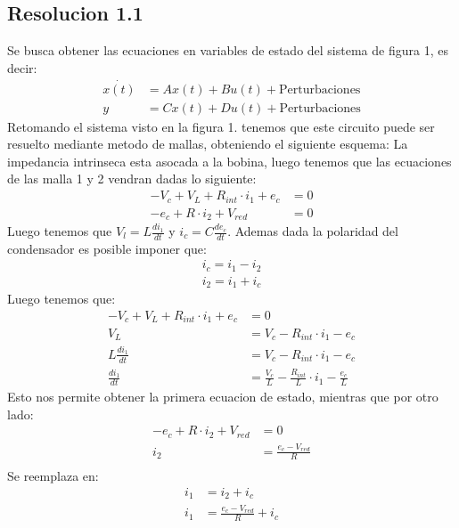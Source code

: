 \documentclass[
  11pt,
  letterpaper,
   addpoints,
   answers
  ]{exam}
\begin{document}
\begin{questions}
\begin{solution}
    \subsection*{Resolucion 1.1}
    Se busca obtener las ecuaciones en variables de estado del sistema de figura 1, es decir:
    \begin{align}
        \dot{x(t)} &= Ax(t) + Bu(t) + \text{Perturbaciones} \\
        y &= Cx(t) + Du(t) + \text{Perturbaciones}
    \end{align}
    Retomando el sistema visto en la figura 1. tenemos que este circuito puede ser resuelto mediante metodo de mallas, obteniendo el siguiente esquema:
    La impedancia intrinseca esta asocada a la bobina, luego tenemos que las ecuaciones de las malla 1 y 2 vendran dadas lo siguiente:
    \begin{align}
        -V_{c} + V_{L} + R_{int} \cdot i_{1} + e_{c}&= 0 \\
        -e_{c}  + R\cdot i_{2} + V_{red} &= 0
    \end{align}
    Luego tenemos que $V_{l} = L \frac{di_{1}}{dt}$ y $i_{c}= C\frac{de_{c}}{dt}$. Ademas dada la polaridad del condensador es posible imponer que:
    \begin{align}
        i_{c} = i_{1} - i_{2}\\
        i_{2} = i_{1} + i_{c}
    \end{align}
    Luego tenemos que:
    \begin{align}
        -V_{c} + V_{L} + R_{int} \cdot i_{1} + e_{c}&= 0\\
        V_{L} &= V_{c} - R_{int} \cdot i_{1} - e_{c}\\
        L \frac{di_{1}}{dt} &= V_{c} - R_{int} \cdot i_{1} - e_{c}\\
        \frac{di_{1}}{dt} &= \frac{V_{c}}{L} - \frac{R_{int}}{L} \cdot i_{1} - \frac{e_{c}}{L} 
    \end{align}
    Esto nos permite obtener la primera ecuacion de estado, mientras que por otro lado:
    \begin{align}
        -e_{c} + R\cdot i_{2} + V_{red} &= 0\\
        i_{2} &= \frac{e_{c} - V_{red}}{R}\\ 
    \end{align}
    Se reemplaza en:
    \begin{align}
        i_{1} &= i_{2} + i_{c}\\
        i_{1} &= \frac{e_{c} - V_{red}}{R} + i_{c}\\

\end{align}
\end{solution}
\end{questions}
\end{document}
